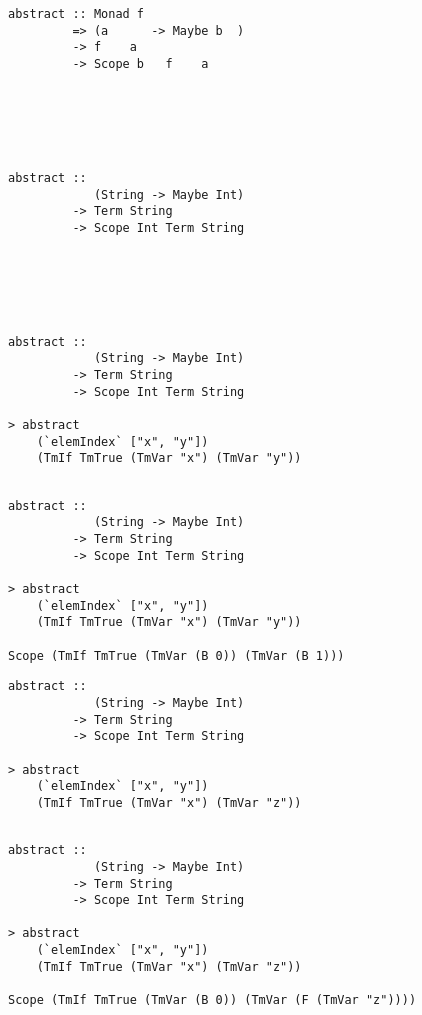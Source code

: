 \documentclass[aspectration=169]{beamer}
\begin{document}
\begin{frame}[fragile]
  \begin{overprint}
  \begin{verbatim}
abstract :: Monad f 
         => (a      -> Maybe b  ) 
         -> f    a 
         -> Scope b   f    a 






  \end{verbatim}  
  \begin{verbatim}
abstract :: 
            (String -> Maybe Int) 
         -> Term String 
         -> Scope Int Term String






  \end{verbatim}  
  \begin{verbatim}
abstract :: 
            (String -> Maybe Int) 
         -> Term String 
         -> Scope Int Term String

> abstract 
    (`elemIndex` ["x", "y"]) 
    (TmIf TmTrue (TmVar "x") (TmVar "y"))


  \end{verbatim}  
  \begin{verbatim}
abstract :: 
            (String -> Maybe Int) 
         -> Term String 
         -> Scope Int Term String

> abstract 
    (`elemIndex` ["x", "y"]) 
    (TmIf TmTrue (TmVar "x") (TmVar "y"))

Scope (TmIf TmTrue (TmVar (B 0)) (TmVar (B 1)))
  \end{verbatim}  
  \begin{verbatim}
abstract :: 
            (String -> Maybe Int) 
         -> Term String 
         -> Scope Int Term String

> abstract 
    (`elemIndex` ["x", "y"]) 
    (TmIf TmTrue (TmVar "x") (TmVar "z"))


  \end{verbatim}  
  \begin{verbatim}
abstract :: 
            (String -> Maybe Int) 
         -> Term String 
         -> Scope Int Term String

> abstract 
    (`elemIndex` ["x", "y"]) 
    (TmIf TmTrue (TmVar "x") (TmVar "z"))

Scope (TmIf TmTrue (TmVar (B 0)) (TmVar (F (TmVar "z"))))
  \end{verbatim}  
  \end{overprint}
\end{frame}
\end{document}
